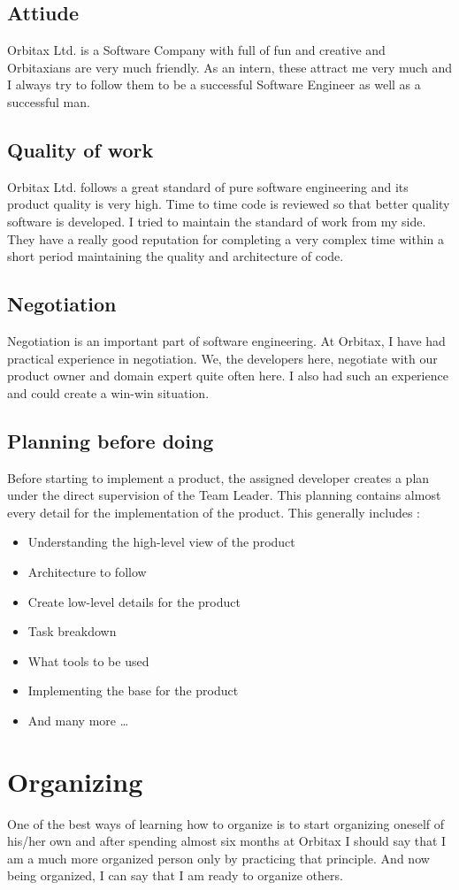 \begin{flushleft}
\subsection{Attiude}
Orbitax Ltd. is a Software Company with full of fun and creative and Orbitaxians are very much friendly. As an intern, these attract me very much and I always try to follow them to be a successful Software Engineer as well as a successful man.

\subsection{ Quality of work}
Orbitax Ltd. follows a great standard of pure software engineering and its product quality is very high. Time to time code is reviewed so that better quality software is developed. I tried to maintain the standard of work from my side. \\
They have a really good reputation for completing a very complex time within a short period maintaining the quality and architecture of code.

\subsection{Negotiation}
Negotiation is an important part of software engineering. At Orbitax, I have had practical experience in negotiation. We, the developers here, negotiate with our product owner and domain expert quite often here. I also had such an experience and could create a win-win situation.
\subsection{Planning before doing}
Before starting to implement a product, the assigned developer creates a plan under the direct supervision of the Team Leader.
This planning contains almost every detail for the implementation of the product. 
This generally includes : 

\begin{itemize}
\item Understanding the high-level view of the product
\item Architecture to follow
\item Create low-level details for the product
\item Task breakdown
\item What tools to be used 
\item Implementing the base for the product
\item And many more …

\end{itemize}


\section{Organizing}
One of the best ways of learning how to organize is to start organizing oneself of his/her own and after spending almost six months at Orbitax I should say that I am a much more organized person only by practicing that principle. And now being organized, I can say that I am ready to organize others.
\end{flushleft}